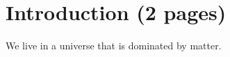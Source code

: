 
\chapter{Introduction (2 pages)}
\label{sec:Introduction}

We live in a universe that is dominated by matter.
